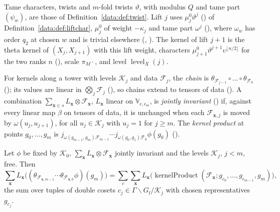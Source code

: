 \begin{definition}\label{ub-objects:def:liftkernel}
Tame characters, twists and $m$-fold twists $\vartheta$, with modulus $Q$ and tame part
$(\psi_w)$, are those of Definition~\ref{data:def:twist}. Lift $j$ uses $\mu^0_j\vartheta^j$
() of Definition~\ref{data:def:liftchar}, $\mu^0_j$ of weight $-\kappa_j$
and tame part $\omega^j$ (), where $\omega_w$ has
order $q_2$ at chosen $w$ and is trivial elsewhere (,
).
The kernel of lift $j+1$ is the theta kernel of $(X_j,X_{j+1})$ with this lift weight, characters
$\mu^0_{j+1}\vartheta^{j+1}\upsilon^{\lfloor n/2\rfloor}$ for the two ranks $n$ (),
scale $\pi_M\cdot$, and level $\operatorname{level}_X(j)$.
\end{definition}

For kernels along a tower with levels $\mathcal K_j$ and data $\mathcal F_j$,
the \emph{chain} is
$\theta_{\mathcal F_{j-1}}\circ\dots\circ\theta_{\mathcal F_0}$ (); its values are linear in
$\bigotimes_j\mathcal F_j$ (), so chains extend to tensors
of data (). A combination $\sum_{\mathbf x\in s}L_{\mathbf x}\otimes\mathcal F_{\mathbf x}$, $L_{\mathbf x}$ linear on
$\mathbb V_{c,\epsilon_m}$, is \emph{jointly invariant} () if, against every linear
map $\beta$ on tensors of data, it is unchanged when each $\mathcal F_{\mathbf x,j}$ is moved by
$\omega(u_j,u_{j+1})$, for all $u_j\in \mathcal K_j$ with $u_j=1$ for $j\ge m$. The \emph{kernel product} at
points $g_0,\dots,g_m$ is $j_{\omega(g_{m-1},g_m)\mathcal F_{m-1}}\cdots j_{\omega(g_0,g_1)\mathcal F_0}\phi(g_0)$
().

\begin{theorem}
\label{ub-objects:thm:plainsum}
Let $\phi$ be fixed by $\mathcal K_0$, $\sum_{\mathbf x}L_{\mathbf x}\otimes\mathcal F_{\mathbf x}$ jointly invariant and the levels $\mathcal K_j$,
$j<m$, free. Then
\[
\sum_{\mathbf x}L_{\mathbf x}\bigl((\theta_{\mathcal F_{\mathbf x,m-1}}\cdots\theta_{\mathcal F_{\mathbf x,0}}\phi)(g_m)\bigr)
=\sum_{c}\sum_{\mathbf x}L_{\mathbf x}\bigl(\operatorname{kernelProduct}(\mathcal F_{\mathbf x};g_{c_0},\dots,g_{c_{m-1}},g_m)\bigr),
\]
the sum over
tuples of double cosets $c_j\in\Gamma\backslash G_{\mathrm f}/\mathcal K_j$ with chosen representatives $g_{c_j}$.
\end{theorem}


